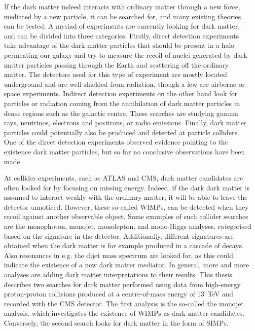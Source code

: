 If the dark matter indeed interacts with ordinary matter through a new force, mediated by a new particle, it can be searched for, and many existing theories can be tested. A myriad of experiments are currently looking for dark matter, and can be divided into three categories. Firstly, direct detection experiments take advantage of the dark matter particles that should be present in a halo permeating our galaxy and try to measure the recoil of nuclei generated by dark matter particles passing through the Earth and scattering off the ordinary matter. The detectors used for this type of experiment are mostly located underground and are well shielded from radiation, though a few are airborne or space experiments. Indirect detection experiments on the other hand look for particles or radiation coming from the annihilation of dark matter particles in dense regions such as the galactic centre. These searches are studying gamma rays, neutrinos, electrons and positrons, or radio emissions. Finally, dark matter particles could potentially also be produced and detected at particle colliders. One of the direct detection experiments observed evidence pointing to the existence dark matter particles, but so far no conclusive observations have been made.

At collider experiments, such as \acs{ATLAS} and \acs{CMS}, dark matter candidates are often looked for by focusing on missing energy. Indeed, if the dark dark matter is assumed to interact weakly with the ordinary matter, it will be able to leave the detector unnoticed. However, these so-called \acfp{WIMP}, can be detected when they recoil against another observable object. Some examples of such collider searches are the monophoton, monojet, monolepton, and mono-Higgs analyses, categorised based on the signature in the detector. Additionally, different signatures are obtained when the dark matter is for example produced in a cascade of decays. Also resonances in e.g. the dijet mass spectrum are looked for, as this could indicate the existence of a new dark matter mediator. In general, more and more analyses are adding dark matter interpretations to their results. This thesis describes two searches for dark matter performed using data from high-energy proton-proton collisions produced at a centre-of-mass energy of \SI{13}{TeV} and recorded with the \acs{CMS} detector. The first analysis is the so-called the monojet analysis, which investigates the existence of \acsp{WIMP} as dark matter candidates. Conversely, the second search looks for dark matter in the form of \acfp{SIMP}.

